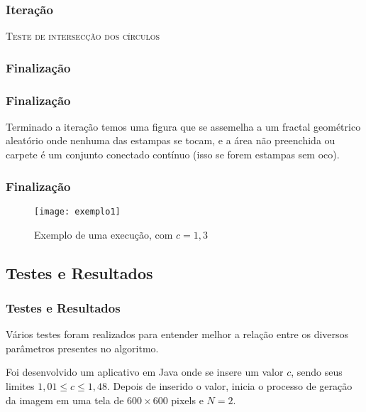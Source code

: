 \documentclass[aspectratio=169,11pt,red]{beamer}
\begin{document}
\begin{frame}
\frametitle{Iteração}

\begin{algorithm}[H]
   \SetAlgoLined
   \label{alg1}
   \caption{\textsc{Teste de intersecção dos círculos}}
 \end{algorithm}

\end{frame}

\subsubsection{Finalização}
\begin{frame}
\frametitle{Finalização}
Terminado a iteração temos uma figura que se assemelha a um fractal geométrico aleatório onde nenhuma das estampas se tocam, e a área não preenchida ou carpete é um conjunto conectado contínuo (isso se forem estampas sem oco).
\end{frame}

\begin{frame}
\frametitle{Finalização}

\begin{figure}[h]
\caption{Exemplo de uma execução, com $c=1,3$}
\centering
\texttt{[image: exemplo1]}
\end{figure}

\end{frame}

\subsection{Testes e Resultados}
\begin{frame}
\frametitle{Testes e Resultados}
Vários testes foram realizados para entender melhor a relação entre os diversos parâmetros presentes no algoritmo.
\medskip

Foi desenvolvido um aplicativo em Java onde se insere um valor $c$, sendo seus limites $1,01 \leqslant c \leqslant 1,48$. Depois de inserido o valor, inicia o processo de geração da imagem em uma tela de $600 \times 600$ pixels e $N=2$.

\end{frame}
\end{document}
